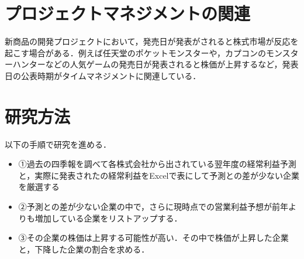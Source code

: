 \documentclass[uplatex,twocolumn,dvipdfmx]{jsarticle}
\begin{document}
\section{プロジェクトマネジメントの関連}
新商品の開発プロジェクトにおいて，発売日が発表がされると株式市場が反応を起こす場合がある．例えば任天堂のポケットモンスターや，カプコンのモンスターハンターなどの人気ゲームの発売日が発表されると株価が上昇するなど，発表日の公表時期がタイムマネジメントに関連している．

\section{研究方法}

以下の手順で研究を進める．
\begin{itemize}
 \item ①過去の四季報を調べて各株式会社から出されている翌年度の経常利益予測と，実際に発表されたの経常利益をExcelで表にして予測との差が少ない企業を厳選する
 \item ②予測との差が少ない企業の中で，さらに現時点での営業利益予想が前年よりも増加している企業をリストアップする．
 \item ③その企業の株価は上昇する可能性が高い．その中で株価が上昇した企業と，下降した企業の割合を求める．
\end{itemize}
\nocite{yabuki2013}\nocite{yabuki2014}


\end{document}
